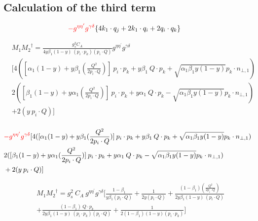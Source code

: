 \subsection*{Calculation of the third term}

\begin{equation}
\begin{split}
&{\color[RGB]{255,0,0} -g^{{{\eta}}{{\eta}^{\prime}}}g^{{{\gamma}}{{\delta}}}}\lbrace 4{k_1}\cdot q_j+2k_1 \cdot q_i +2q_i \cdot q_k\rbrace
\end{split}
\end{equation}

\begin{equation}
\begin{split}
&M_1{M_2}^{\dagger}=\frac{g_s^2 C_A}{4y\beta_1 (1-y)\:(p_i \cdot p_k)(p_i \cdot Q)}
g^{{{\eta}}{{\eta}^{\prime}}}g^{{{\gamma}}{{\delta}}} \\
&[4([\alpha_1 (1-y)+y\beta_1(\frac{Q^2}{2p_i \cdot Q})]\:p_i \cdot p_k+y\beta_1\:Q\cdot p_k+\sqrt{\alpha_1\beta_1y(1-y)} p_k \cdot {n_{\bot,1}})\\
&2([\beta_1 (1-y)+y\alpha_1(\frac{Q^2}{2p_i \cdot Q})]\:p_i \cdot p_k+y\alpha_1\:Q\cdot p_k-\sqrt{\alpha_1\beta_1y(1-y)} p_k \cdot {n_{\bot,1}})\\
&+2(y\:p_i\cdot Q)]\\
\end{split}
\end{equation}

\begin{equation}
\begin{split}
&{\color[RGB]{255,0,0} -g^{{{\eta}}{{\eta}^{\prime}}}g^{{{\gamma}}{{\delta}}}}[ 4([\alpha_1 (1-y)+y\beta_1(\frac{Q^2}{2p_i \cdot Q})]\:p_i \cdot p_k+y\beta_1\:Q\cdot p_k+\sqrt{\alpha_1\beta_1y(1-y)} p_k \cdot {n_{\bot,1}})\\
&2([\beta_1 (1-y)+y\alpha_1(\frac{Q^2}{2p_i \cdot Q})]\:p_i \cdot p_k+y\alpha_1\:Q\cdot p_k-\sqrt{\alpha_1\beta_1y(1-y)} p_k \cdot {n_{\bot,1}})\\
&+2(y\:p_i\cdot Q)]
\end{split}
\end{equation}

\begin{equation}
\begin{split}
&M_1{M_2}^{\dagger}=g_s^2\: C_A\:g^{{{\eta}}{{\eta}^{\prime}}}g^{{{\gamma}}{{\delta}}}[\frac{1-\beta_1}{y\beta_1 (p_i \cdot Q)}+\frac{1}{2y(p_i \cdot Q)}+\frac{(1-\beta_1)(\frac{Q^2}{2p_i \cdot Q})}{2y\beta_1 (1-y)\:(p_i \cdot Q)}\\
&+\frac{(1-\beta_1)\:Q\cdot p_k}{2y\beta_1 (1-y)\:(p_i \cdot p_k)(p_i \cdot Q)}+\frac{1}{2(1-\beta_1)(1-y) (p_i \cdot p_k)}]\\
\end{split}
\end{equation}

